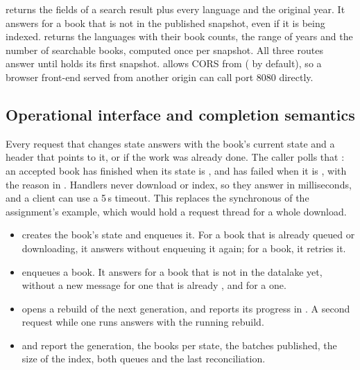  returns the fields of a search result plus every language and the original year. It answers
 for a book that is not in the published snapshot, even if it is being indexed. 
returns the languages with their book counts, the range of years and the number of searchable books, computed once per
snapshot. All three routes answer  until  holds its first snapshot.  allows CORS from
 (\code{*} by default), so a browser front-end served from another origin can call
port 8080 directly.

\subsection{Operational interface and completion semantics}
\label{sec:async}

Every request that changes state answers  with the book's current state and a 
header that points to it, or  if the work was already done. The caller polls that : an
accepted book has finished when its state is , and has failed when it is , with the reason
in . Handlers never download or index, so they answer in milliseconds, and a client can use a 5\,s
timeout. This replaces the synchronous  of the assignment's example, which would hold a request
thread for a whole download.

\begin{itemize}
\item {} creates the book's state and enqueues it. For a book that is already queued or
  downloading, it answers  without enqueuing it again; for a  book, it retries it.
\item {} enqueues a  book. It answers  for a
  book that is not in the datalake yet,  without a new message for one that is already , and
   for a  one.
\item {} opens a rebuild of the next generation, and  reports its
  progress in . A second request while one runs answers  with the running rebuild.
\item {} and  report the generation, the books per state, the batches
  published, the size of the index, both queues and the last reconciliation.
\end{itemize}

